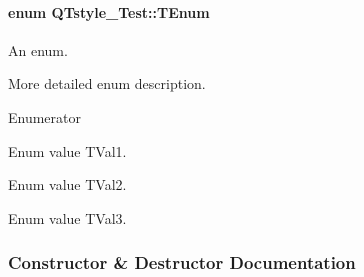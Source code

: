 \paragraph[{\texorpdfstring{T\+Enum}{TEnum}}]{\setlength{\rightskip}{0pt plus 5cm}enum {\bf Q\+Tstyle\+\_\+\+Test\+::\+T\+Enum}}\hypertarget{class_q_tstyle___test_a0525f798cda415a94fedeceb806d2c49}{}\label{class_q_tstyle___test_a0525f798cda415a94fedeceb806d2c49}


An enum. 

More detailed enum description. \begin{Desc}
\item[Enumerator]\par
\begin{description}
\item[{\em 
T\+Val1\hypertarget{class_q_tstyle___test_a0525f798cda415a94fedeceb806d2c49a7929af91f99c319ffe2e49c9632bc3fa}{}\label{class_q_tstyle___test_a0525f798cda415a94fedeceb806d2c49a7929af91f99c319ffe2e49c9632bc3fa}
}]Enum value T\+Val1. \item[{\em 
T\+Val2\hypertarget{class_q_tstyle___test_a0525f798cda415a94fedeceb806d2c49afff89db6859123549579806212d9fd80}{}\label{class_q_tstyle___test_a0525f798cda415a94fedeceb806d2c49afff89db6859123549579806212d9fd80}
}]Enum value T\+Val2. \item[{\em 
T\+Val3\hypertarget{class_q_tstyle___test_a0525f798cda415a94fedeceb806d2c49a8227cd0f0c1285d59ff14376fcd00f85}{}\label{class_q_tstyle___test_a0525f798cda415a94fedeceb806d2c49a8227cd0f0c1285d59ff14376fcd00f85}
}]Enum value T\+Val3. \end{description}
\end{Desc}


\subsubsection{Constructor \& Destructor Documentation}
